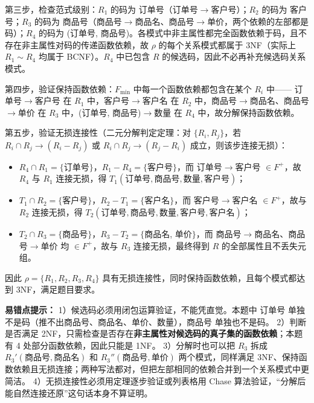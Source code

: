 \documentclass[a4paper,11pt]{article}
\begin{document}
第三步，检查范式级别：$R_1$ 的码为 订单号（订单号$\to$客户号）；$R_2$ 的码为 客户号；$R_3$ 的码为 商品号（商品号$\to$商品名、商品号$\to$单价，两个依赖的左部都是码）；$R_4$ 的码为 (订单号, 商品号)。各模式中非主属性都完全函数依赖于码，且不存在非主属性对码的传递函数依赖，故 $\rho$ 的每个关系模式都属于 3NF（实际上 $R_1\sim R_4$ 均属于 BCNF）。$R_4$ 中已包含 $R$ 的候选码，因此不必再补充候选码关系模式。

第四步，验证保持函数依赖：$F_{\min}$ 中每一个函数依赖都包含在某个 $R_i$ 中——
订单号$\to$客户号 在 $R_1$ 中，客户号$\to$客户名 在 $R_2$ 中，商品号$\to$商品名、商品号$\to$单价 在 $R_3$ 中，(订单号, 商品号)$\to$数量 在 $R_4$ 中，故分解保持函数依赖。

第五步，验证无损连接性（二元分解判定定理：对 $\{R_i,R_j\}$，若 $R_i\cap R_j\to(R_i-R_j)$ 或 $R_i\cap R_j\to(R_j-R_i)$ 成立，则该步连接无损）：
\begin{itemize}[leftmargin=1.6em, itemsep=1pt]
  \item $R_4\cap R_1=\{$订单号$\}$，$R_1-R_4=\{$客户号$\}$，而 订单号$\to$客户号 $\in F^{+}$，故 $R_4$ 与 $R_1$ 连接无损，得 $T_1(\text{订单号},\text{商品号},\text{数量},\text{客户号})$；
  \item $T_1\cap R_2=\{$客户号$\}$，$R_2-T_1=\{$客户名$\}$，而 客户号$\to$客户名 $\in F^{+}$，故与 $R_2$ 连接无损，得 $T_2(\text{订单号},\text{商品号},\text{数量},\text{客户号},\text{客户名})$；
  \item $T_2\cap R_3=\{$商品号$\}$，$R_3-T_2=\{$商品名, 单价$\}$，而 商品号$\to$商品名、商品号$\to$单价 均 $\in F^{+}$，故与 $R_3$ 连接无损，最终得到 $R$ 的全部属性且不丢失元组。
\end{itemize}
因此 $\rho=\{R_1,R_2,R_3,R_4\}$ 具有无损连接性，同时保持函数依赖，且每个模式都达到 3NF，满足题目要求。

\begin{analysis}
\textbf{易错点提示：}
1）候选码必须用闭包运算验证，不能凭直觉。本题中 订单号 单独不是码（推不出商品号、商品名、单价、数量），商品号 单独也不是码。
2）判断是否满足 2NF，只需检查是否存在\textbf{非主属性对候选码的真子集的函数依赖}；本题有 4 处部分函数依赖，因此只能是 1NF。
3）分解时也可以把 $R_3$ 拆成 $R_3'(\text{商品号},\text{商品名})$ 和 $R_3''(\text{商品号},\text{单价})$ 两个模式，同样满足 3NF、保持函数依赖且无损连接；两种写法都对，但把左部相同的依赖合并到一个关系模式中更简洁。
4）无损连接性必须用定理逐步验证或列表格用 Chase 算法验证，“分解后能自然连接还原”这句话本身不算证明。
\end{analysis}
\end{document}

